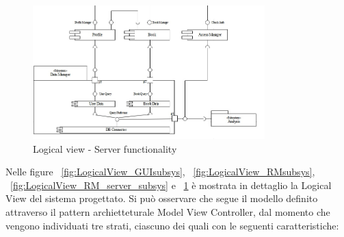 \begin{figure}[h!]
	\centering
	\includegraphics[width=0.8\textwidth]{Immagini/Server_subsys}
	\caption{Logical view - Server functionality}
	\label{fig:LogicalView_ServerSubsys}
\end{figure}
\noindent
Nelle figure ~\ref{fig:LogicalView_GUIsubsys}, ~\ref{fig:LogicalView_RMsubsys}, ~\ref{fig:LogicalView_RM_server_subsys} e ~\ref{fig:LogicalView_ServerSubsys} è mostrata in dettaglio la Logical View del sistema progettato. Si può osservare che segue il modello definito attraverso il pattern archietteturale Model View Controller, dal momento che vengono individuati tre strati, ciascuno dei quali con le seguenti caratteristiche:
